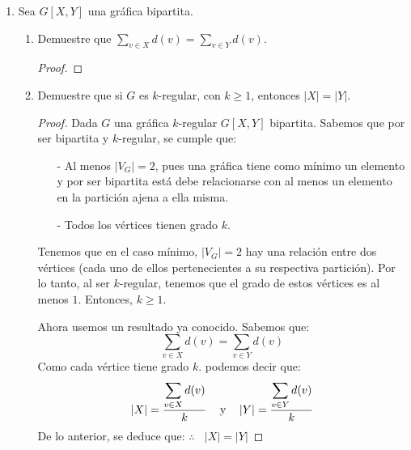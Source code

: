\documentclass{article}
\begin{document}
\begin{enumerate}
  \item Sea $G[X, Y]$ una gr\'afica bipartita.
    \begin{enumerate}
      \item Demuestre que $\sum_{v \in X} d(v) = \sum_{v \in Y} d(v)$.
        \begin{proof}
          
        \end{proof}
        
      \item Demuestre que si $G$ es $k$-regular, con $k \ge 1$, entonces
        $|X| = |Y|$.
        \begin{proof}
          Dada $G$ una gráfica $k$-regular $G[X,Y]$ bipartita. 
          Sabemos que por ser bipartita y $k$-regular, se cumple que:
          \begin{itemize}
          \item[-] Al menos $|V_G|=2$, pues una gráfica tiene como mínimo
            un elemento y por ser bipartita está debe relacionarse con al
            menos un elemento en la partición ajena a ella misma. 
            
          \item[-] Todos los vértices tienen grado $k$.
          \end{itemize}
          Tenemos que en el caso mínimo, $|V_G| = 2$  hay una relación entre
          dos vértices (cada uno de ellos pertenecientes a su respectiva
          partición). Por lo tanto, al ser $k$-regular, tenemos que el grado
          de estos vértices es al menos $1$. Entonces, $k \geq 1$.
          
          Ahora usemos un resultado ya conocido. Sabemos que:
          \[
          \sum_{v \in X} d(v) = \sum_{v \in Y} d(v)
          \]
          Como cada vértice tiene grado $k$. podemos decir que:
          \[
          \abs{X} = \frac{\displaystyle \sum_{v \in X} d(v)}{k} \text{\hspace{0.3cm}
            y \hspace{0.3cm}} \abs{Y} = \frac{\displaystyle \sum_{v \in Y} d(v)}{k}
          \]
          De lo anterior, se deduce que:
          \hspace*{5.6cm} $\therefore\ \ \ \ |X| = |Y|$
        \end{proof}
    \end{enumerate}
    
\end{enumerate}
\end{document}
